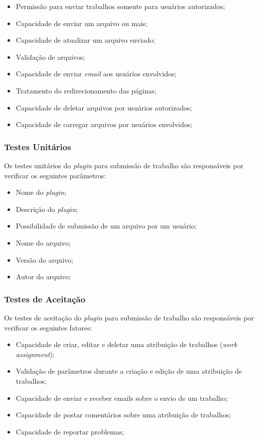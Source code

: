 \begin{itemize}
\item Permissão para enviar trabalhos somente para usuários autorizados;
\item Capacidade de enviar um arquivo ou mais;
\item Capacidade de atualizar um arquivo enviado;
\item Validação de arquivos;
\item Capacidade de enviar \textit{email} aos usuários envolvidos;
\item Tratamento do redirecionamento das páginas;
\item Capacidade de deletar arquivos por usuários autorizados;
\item Capacidade de carregar arquivos por usuários envolvidos;
\end{itemize}

\subsubsection{Testes Unitários}

Os testes unitários do \textit{plugin} para submissão de trabalho são responsáveis por verificar os seguintes parâmetros:

\begin{itemize}
\item Nome do \textit{plugin};
\item Descrição do \textit{plugin};
\item Possibilidade de submissão de um arquivo por um usuário;
\item Nome do arquivo;
\item Versão do arquivo;
\item Autor do arquivo;
\end{itemize}

\subsubsection{Testes de Aceitação}

Os testes de aceitação do \textit{plugin} para submissão de trabalho são responsáveis por verificar os seguintes fatores:

\begin{itemize}
\item Capacidade de criar, editar e deletar uma atribuição de trabalhos (\textit{work assignment});
\item Validação de parâmetros durante a criação e edição de uma atribuição de trabalhos;
\item Capacidade de enviar e receber emails sobre o envio de um trabalho;
\item Capacidade de postar comentários sobre uma atribuição de trabalhos;
\item Capacidade de reportar problemas;
\end{itemize}


